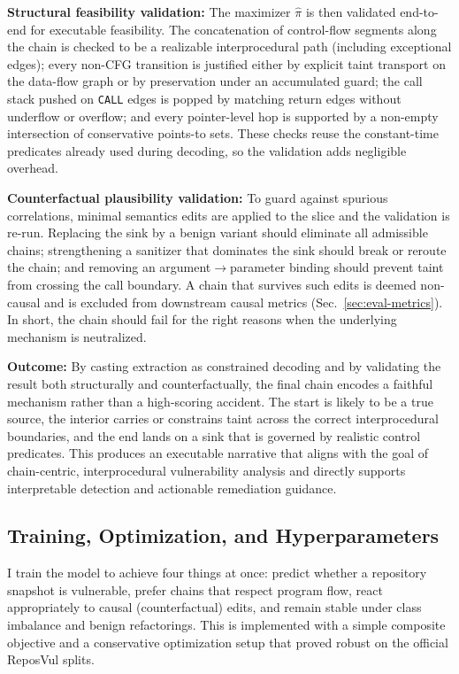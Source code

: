 \documentclass{buthesis}
\begin{document}
\textbf{Structural feasibility validation:}
The maximizer $\hat{\pi}$ is then validated end-to-end for executable feasibility. The concatenation of control-flow segments along the chain is checked to be a realizable interprocedural path (including exceptional edges); every non-CFG transition is justified either by explicit taint transport on the data-flow graph or by preservation under an accumulated guard; the call stack pushed on \texttt{CALL} edges is popped by matching return edges without underflow or overflow; and every pointer-level hop is supported by a non-empty intersection of conservative points-to sets. These checks reuse the constant-time predicates already used during decoding, so the validation adds negligible overhead.

\textbf{Counterfactual plausibility validation:}
To guard against spurious correlations, minimal semantics edits are applied to the slice and the validation is re-run. Replacing the sink by a benign variant should eliminate all admissible chains; strengthening a sanitizer that dominates the sink should break or reroute the chain; and removing an argument$\rightarrow$parameter binding should prevent taint from crossing the call boundary. A chain that survives such edits is deemed non-causal and is excluded from downstream causal metrics (Sec.~\ref{sec:eval-metrics}). In short, the chain should fail for the right reasons when the underlying mechanism is neutralized.

\textbf{Outcome:}
By casting extraction as constrained decoding and by validating the result both structurally and counterfactually, the final chain encodes a faithful mechanism rather than a high-scoring accident. The start is likely to be a true source, the interior carries or constrains taint across the correct interprocedural boundaries, and the end lands on a sink that is governed by realistic control predicates. This produces an executable narrative that aligns with the goal of chain-centric, interprocedural vulnerability analysis and directly supports interpretable detection and actionable remediation guidance.


\subsection{Training, Optimization, and Hyperparameters}
\label{sec:method-train}

I train the model to achieve four things at once: predict whether a repository snapshot is vulnerable, prefer chains that respect program flow, react appropriately to causal (counterfactual) edits, and remain stable under class imbalance and benign refactorings. This is implemented with a simple composite objective and a conservative optimization setup that proved robust on the official ReposVul splits.
\end{document}
